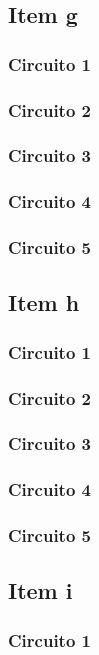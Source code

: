 \documentclass[a4paper, 12pt]{article}
\begin{document}
		\subsection{Item g}		
			\subsubsection{Circuito 1}
			\subsubsection{Circuito 2}
			\subsubsection{Circuito 3}
			\subsubsection{Circuito 4}
			\subsubsection{Circuito 5}		
		\subsection{Item h}		
			\subsubsection{Circuito 1}
			\subsubsection{Circuito 2}
			\subsubsection{Circuito 3}
			\subsubsection{Circuito 4}
			\subsubsection{Circuito 5}		
		\subsection{Item i}			
			\subsubsection{Circuito 1}
\end{document}
